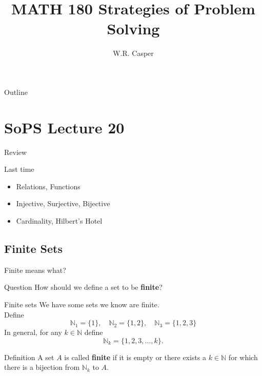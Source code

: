 \documentclass{beamer}
\title{MATH 180 Strategies of Problem Solving}
\subtitle
{} %
\author[W.R. Casper] %
{W.R. Casper}
\institute[California State University Fullerton] %
{
  Department of Mathematics\\
  California State University Fullerton}
\begin{document}
\begin{frame}
  \titlepage
\end{frame}

\begin{frame}{Outline}
  \tableofcontents
\end{frame}



\section{SoPS Lecture 20}

\begin{frame}{Review}
  \begin{block}{Last time}
    \begin{itemize}
\pause
      \item Relations, Functions
\pause
      \item Injective, Surjective, Bijective
\pause
      \item Cardinality, Hilbert's Hotel
    \end{itemize}
  \end{block}
\end{frame}

\subsection{Finite Sets}

\begin{frame}{Finite means what?}
\begin{block}{Question}
How should we define a set to be \textbf{finite}?
\end{block}
\end{frame}

\begin{frame}{Finite sets}
We have some sets we know are finite.\\
\pause
Define
$$\mathbb N_1 = \{1\},\quad\mathbb N_2 = \{1,2\},\quad\mathbb N_3 = \{1,2,3\}$$
\pause
In general, for any $k\in\mathbb N$ define
$$\mathbb N_k = \{1,2,3,\dots, k\}.$$
\pause
\begin{block}{Definition}
A set $A$ is called \textbf{finite} if it is empty or there exists a $k\in\mathbb N$ for which there is a bijection from $\mathbb N_k$ to $A$.
\end{block}
\end{frame}
\end{document}
